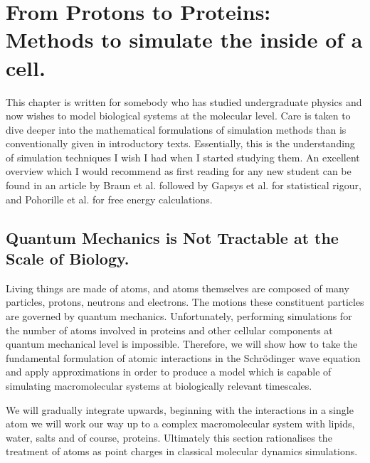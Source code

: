 \chapter{From Protons to Proteins: Methods to simulate the inside of a cell.}

\label{chap:methods}

  {}

This chapter is written for somebody who has studied undergraduate physics and now wishes to model biological systems at the molecular level. Care is taken to dive deeper into the mathematical formulations of simulation methods than is conventionally given in introductory texts. Essentially, this is the understanding of simulation techniques I wish I had when I started studying them. An excellent overview which I would recommend as first reading for any new student can be found in an article by Braun et al. \cite{braun2019} followed by Gapsys et al. \cite{gapsys2020} for statistical rigour, and Pohorille et al. \cite{pohorille2010} for free energy calculations.  

\section{Quantum Mechanics is Not Tractable at the Scale of Biology.}
Living things are made of atoms, and atoms themselves are composed of many particles, protons, neutrons and electrons. The motions these constituent particles are governed by quantum mechanics. Unfortunately, performing simulations for the number of atoms involved in proteins and other cellular components at quantum mechanical level is impossible. Therefore, we will show how to take the fundamental formulation of atomic interactions in the Schr\"{o}dinger wave equation and apply approximations in order to produce a model which is capable of simulating macromolecular systems at biologically relevant timescales. 

We will gradually integrate upwards, beginning with the interactions in a single atom we will work our way up to a complex macromolecular system with lipids, water, salts and of course, proteins. Ultimately this section rationalises the treatment of atoms as point charges in classical molecular dynamics simulations. 

